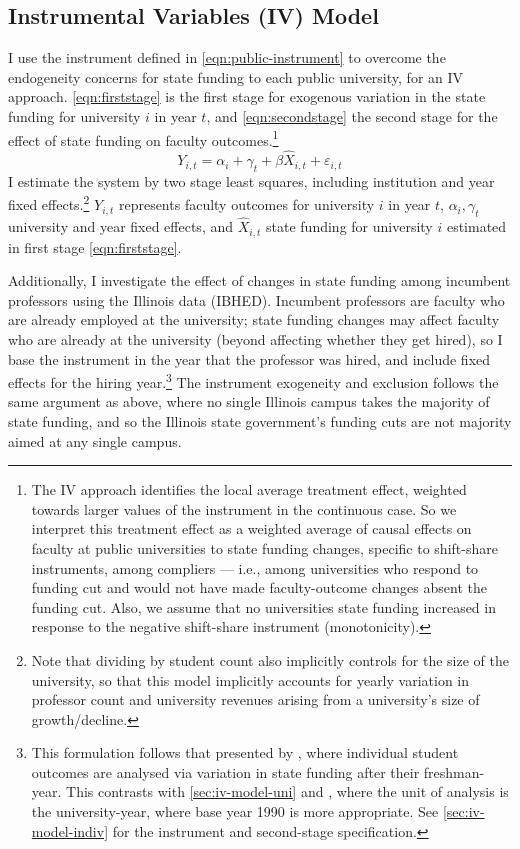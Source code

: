 \subsection{Instrumental Variables (IV) Model}
\label{sec:iv-model-uni}
I use the instrument defined in \autoref{eqn:public-instrument} to overcome the endogeneity concerns for state funding to each public university, for an IV approach.
\autoref{eqn:firststage} is the first stage for exogenous variation in the state funding for university $i$ in year $t$, and \autoref{eqn:secondstage} the second stage for the effect of state funding on faculty outcomes.\footnote{
    The IV approach identifies the local average treatment effect, weighted towards larger values of the instrument in the continuous case.
    So we interpret this treatment effect as a weighted average of causal effects on faculty at public universities to state funding changes, specific to shift-share instruments, among compliers --- i.e., among universities who respond to funding cut and would not have made faculty-outcome changes absent the funding cut.
    Also, we assume that no universities state funding increased in response to the negative shift-share instrument (monotonicity).
}
\begin{equation}
    \label{eqn:secondstage}
    Y_{i,t} = \alpha_i + \gamma_t + \beta \widehat X_{i,t} + \varepsilon_{i,t}
\end{equation}
I estimate the system by two stage least squares, including institution and year fixed effects.\footnote{
    Note that dividing by student count also implicitly controls for the size of the university, so that this model implicitly accounts for yearly variation in professor count and university revenues arising from a university's size of growth/decline.
}
$Y_{i,t}$ represents faculty outcomes for university $i$ in year $t$, $\alpha_i, \gamma_t$ university and year fixed effects, and $\widehat X_{i,t}$ state funding for university $i$ estimated in first stage \eqref{eqn:firststage}.

Additionally, I investigate the effect of changes in state funding among incumbent professors using the Illinois data (IBHED).
Incumbent professors are faculty who are already employed at the university; state funding changes may affect faculty who are already at the university (beyond affecting whether they get hired), so I base the instrument in the year that the professor was hired, and include fixed effects for the hiring year.\footnote{
    This formulation follows that presented by \cite{NBERw27885}, where individual student outcomes are analysed via variation in state funding after their freshman-year.
    This contrasts with \autoref{sec:iv-model-uni} and \cite{NBERw23736}, where the unit of analysis is the university-year, where base year 1990 is more appropriate.
    See \autoref{sec:iv-model-indiv} for the instrument and second-stage specification.
}
The instrument exogeneity and exclusion follows the same argument as above, where no single Illinois campus takes the majority of state funding, and so
the Illinois state government's funding cuts are not majority aimed at any single campus.


